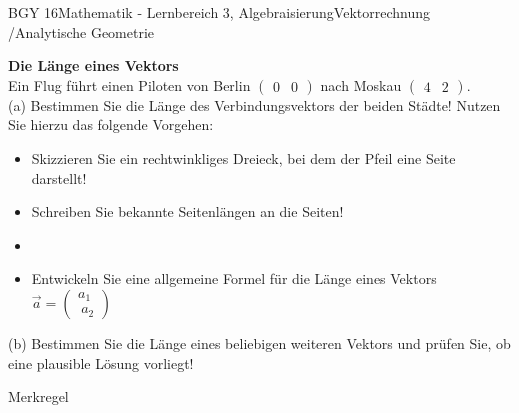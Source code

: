 \documentclass[oneside,openany,headings=optiontotoc,11pt,numbers=noenddot]{scrreprt}
\begin{document}
\begin{worksheet}{BGY 16}{Mathematik - Lernbereich 3, Algebraisierung}{Vektorrechnung /Analytische Geometrie}
\begin{framed}
			\bigskip
			\color{black}
		\end{framed}
		\begin{framed}
			\noindent
			\textbf{Die Länge eines Vektors}\\
			Ein Flug führt einen Piloten von Berlin \(\begin{pmatrix}0 & 0\end{pmatrix}\) nach Moskau \(\begin{pmatrix}4 & 2\end{pmatrix}\).\\
			(a) Bestimmen Sie die Länge des Verbindungsvektors der beiden Städte! Nutzen Sie hierzu das folgende Vorgehen:
			\begin{framed}
					\begin{itemize}
						\item Skizzieren Sie ein rechtwinkliges Dreieck, bei dem der Pfeil eine Seite darstellt!
						\item Schreiben Sie bekannte Seitenlängen an die Seiten!
						\item[]
						\item Entwickeln Sie eine allgemeine Formel für die Länge eines Vektors \(\overrightarrow{a} = \begin{pmatrix}
						a_{1} \\\ a_{2}
						\end{pmatrix}\)
					\end{itemize}
			\end{framed}
			\noindent
			(b) Bestimmen Sie die Länge eines beliebigen weiteren Vektors und prüfen Sie, ob eine plausible Lösung vorliegt!
		\end{framed}
		\begin{framed}
			\color{codegray}\tiny Merkregel
			\par
			\bigskip
			\color{black}
		\end{framed}
	\end{worksheet}
\end{document}
